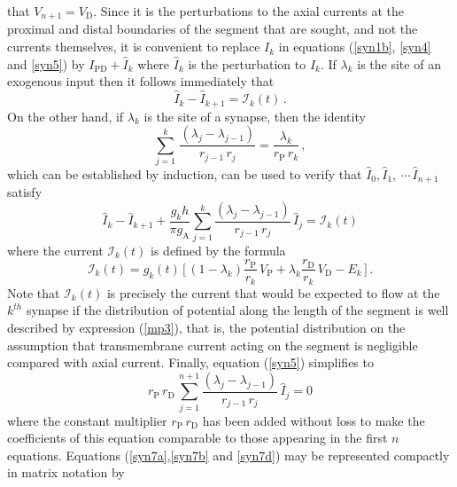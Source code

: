 that $V_{n+1}=V_\mathrm{D}$. Since it is the perturbations to the
axial currents at the proximal and distal boundaries of the
segment that are sought, and not the currents themselves, it is
convenient to replace $I_k$ in equations (\ref{syn1b}, \ref{syn4}
and \ref{syn5}) by $I_\mathrm{PD}+\widehat{I}_k$ where
$\widehat{I}_k$ is the perturbation to $I_k$. If $\lambda_k$ is
the site of an exogenous input then it follows immediately that
\begin{equation}\label{syn7a}
\widehat{I}_k-\widehat{I}_{k+1}=\mathcal{I}_k(t)\,.
\end{equation}
On the other hand, if $\lambda_k$ is the site of a synapse, then
the identity
\begin{equation}\label{syn6}
\sum_{j=1}^k \,\frac{(\lambda_j-\lambda_{j-1})}{r_{j-1}\,r_j}
=\frac{\lambda_k}{r_\mathrm{P}\,r_k}\,,
\end{equation}
which can be established by induction, can be used to verify that
$\widehat{I}_0, \widehat{I}_1,\ \cdots \,\widehat{I}_{n+1}$
satisfy
\begin{equation}\label{syn7b}
\widehat{I}_k-\widehat{I}_{k+1}+\frac{g_k h}{\pi g_\mathrm{A}}
\sum_{j=1}^k \frac{(\lambda_j-\lambda_{j-1})}{r_{j-1}\,r_j}\,
\widehat{I}_j = \mathcal{I}_k(t)
\end{equation}
where the current $\mathcal{I}_k(t)$ is defined by the formula
\begin{equation}\label{syn7c}
\mathcal{I}_k(t)=g_k(t)\,\Big[\,(1-\lambda_k)\frac{r_\mathrm{P}}{r_k}
\,V_\mathrm{P}+\lambda_k\frac{r_\mathrm{D}}{r_k}\, V_\mathrm{D}
-E_k\,\Big]\,.
\end{equation}
Note that $\mathcal{I}_k(t)$ is precisely the current that would
be expected to flow at the $k^{th}$ synapse if the distribution of
potential along the length of the segment is well described by
expression (\ref{mp3}), that is, the potential distribution on the
assumption that transmembrane current acting on the segment is
negligible compared with axial current. Finally, equation
(\ref{syn5}) simplifies to
\begin{equation}\label{syn7d}
r_\mathrm{P}\,r_\mathrm{D}\,\sum_{j=1}^{n+1}
\frac{(\lambda_j-\lambda_{j-1})}{r_{j-1}\,r_j}\,\widehat{I}_j = 0
\end{equation}
where the constant multiplier $r_\mathrm{P}\,r_\mathrm{D}$ has
been added without loss to make the coefficients of this equation
comparable to those appearing in the first $n$ equations.
Equations (\ref{syn7a},\ref{syn7b} and \ref{syn7d}) may be
represented compactly in matrix notation by
